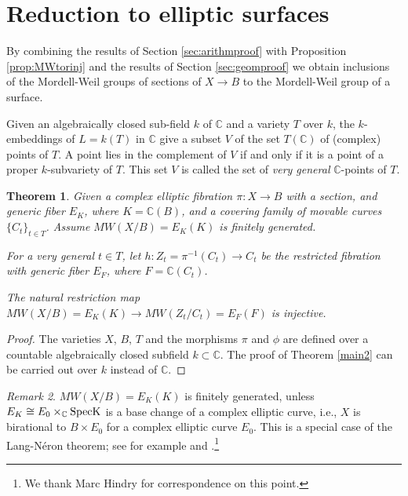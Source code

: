 \documentclass[11pt]{amsart}
\newtheorem{theorem}{Theorem}[section]
\theoremstyle{definition}
\theoremstyle{definition}
\theoremstyle{remark}
\newtheorem{remark}[theorem]{Remark}
\theoremstyle{remark}
\theoremstyle{definition}
\theoremstyle{conjecture}
\begin{document}
\section{Reduction to elliptic surfaces}\label{sec:inclusion}

By combining the results of Section \ref{sec:arithmproof} with Proposition \ref{prop:MWtorinj} and the results of Section \ref{sec:geomproof} we obtain inclusions of the Mordell-Weil groups  of sections of $X \to B$ to the Mordell-Weil group of a surface.  


Given an algebraically closed sub-field $k$ of $\mathbb{C}$ and a variety $T$ over $k$, the $k$-embeddings of $L=k(T)$ in $\mathbb{C}$ give a subset $V$ of
the set $T(\mathbb{C})$ of (complex) points of $T$. A point lies in the complement of $V$ if and only if it is a point of a proper $k$-subvariety of $T$. This set $V$ is called the set of \emph{very general} $\mathbb{C}$-points of $T$.
\begin{theorem}\label{thm:fieldExt}
    Given a complex elliptic fibration $\pi:X\to B$ with a section, and
    generic fiber $E_K$, where $K={\mathbb C}(B)$, and a covering
    family of movable curves $\{C_t\}_{t\in T}$.  Assume $MW(X/B)=E_K(K)$ is finitely generated.

    For a \emph{very general} $t\in T$, let $h:Z_t=\pi^{-1}(C_t)\to C_t$ be the restricted fibration with generic fiber $E_F$, where $F=\mathbb{C}(C_t)$.

    The natural restriction map $MW(X/B)=E_K(K)\to
    MW(Z_t/C_t)=E_F(F)$  is \emph{injective}.
\end{theorem}

\begin{proof}
   The varieties $X$, $B$, $T$ and the morphisms $\pi$ and $\phi$ are
defined over a countable algebraically closed subfield $k\subset \mathbb{C}$.
The proof of Theorem \ref{main2} can be carried out over $k$ instead of
$\mathbb{C}$. 
\end{proof}


\begin{remark}
$MW (X/B) = E_K (K)$ is finitely generated, unless $E_K\cong
E_0\times_{\mathbb C}{\rm Spec K}$ is a base change of a complex
elliptic curve, i.e., $X$ is birational to $B\times E_0$ for a
complex elliptic curve $E_0$. This is a special case of the
Lang-N\'eron theorem; see for example  \cite{Conrad2006, Lang1959, Silverman1994} and \cite[Th\'eor\`eme 2, with a detailed proof in Appendix 2]{Kahn-Hindry}.\footnote{We  thank Marc Hindry for correspondence on this point.}
     
 \end{remark}
\color{black}
\end{document}
